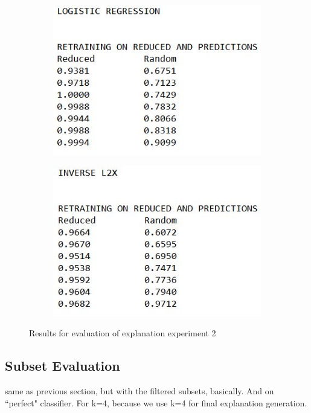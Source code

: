 \begin{figure}[H]
	\centering
	\begin{subfigure}[b]{0.4\textwidth}
		\includegraphics[width=\textwidth]{img/expleval2_logreg.JPG}
	\end{subfigure}
	\begin{subfigure}[b]{0.4\textwidth}
		\includegraphics[width=\textwidth]{img/expleval2_invL2X.JPG}
	\end{subfigure}
	\caption{Results for evaluation of explanation experiment 2}
	\label{fig:results_expleval2}
\end{figure}



\subsection{Subset Evaluation}
same as previous section, but with the filtered subsets, basically. And on ``perfect" classifier. For k=4, because we use k=4 for final explanation generation.




